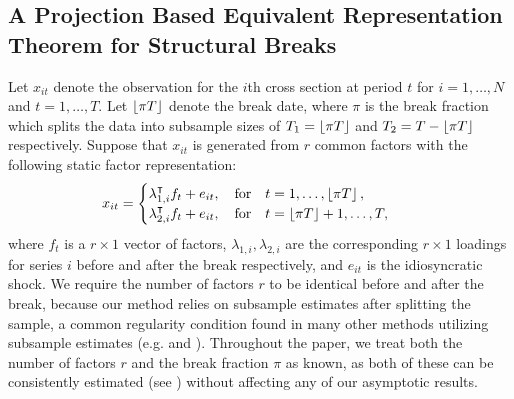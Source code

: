 \documentclass[12pt]{article}
\newcommand*{\tran}{\intercal}
\theoremstyle{plain}
\numberwithin{equation}{section}
\begin{document}
\subsection{A Projection Based Equivalent Representation Theorem for Structural Breaks}
Let $x_{it}$ denote the observation for the $i$th cross section at period $t$ for $i = 1, \dots, N$ and $t = 1, \dots, T$. Let $\left \lfloor \pi T \right \rfloor$ denote the break date, where $\pi$ is the break fraction which splits the data into subsample sizes of $T_1 = \left \lfloor \pi T \right \rfloor$ and $T_2 = T - \left \lfloor \pi T \right \rfloor$ respectively. Suppose that $x_{it}$ is generated from $r$ common factors with the following static factor representation:
\begin{align}
\label{eqn:static_factor_rep}
x_{it} &= 
\begin{cases}
\lambda_{1, i}^\tran f_t + e_{it}, \quad \text{for} \quad t = 1, \dots, \floor{\pi T}, \\
\lambda_{2, i}^\tran f_t + e_{it}, \quad \text{for} \quad t = \floor{\pi T} + 1, \dots, T,
\end{cases}
\end{align}
where $f_t$ is a $r \times 1$ vector of factors, $\lambda_{1, i}, \lambda_{2, i}$ are the corresponding $r \times 1$ loadings for series $i$ before and after the break respectively, and $e_{it}$ is the idiosyncratic shock. We require the number of factors $r$ to be identical before and after the break, because our method relies on subsample estimates after splitting the sample, a common regularity condition found in many other methods utilizing subsample estimates (e.g. \textcite{ma_estimation_2018} and \textcite{bai_estimation_2020}). Throughout the paper, we treat both the number of factors $r$ and the break fraction $\pi$ as known, as both of these can be consistently estimated (see ) without affecting any of our asymptotic results.
\end{document}
